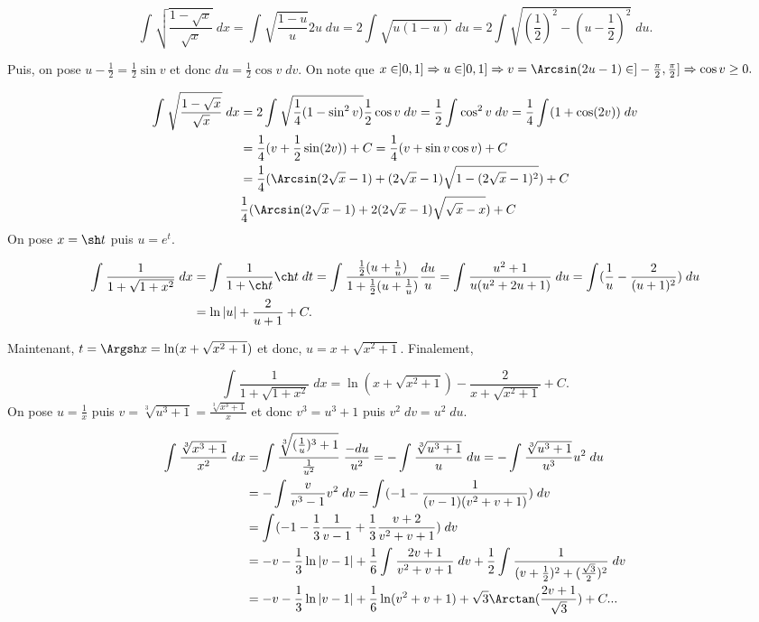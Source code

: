 {{$$\int_{}^{}\sqrt{\frac{1-\sqrt{x}}{\sqrt{x}}}\;dx=\int_{}^{}\sqrt{\frac{1-u}{u}}2u\;du=2\int_{}^{}\sqrt{u(1-u)}\;du
=2\int_{}^{}\sqrt{(\frac{1}{2})^2-(u-\frac{1}{2})^2}\;du.$$

Puis, on pose $u-\frac{1}{2}=\frac{1}{2}\sin v$ et donc $du=\frac{1}{2}\cos v\;dv$. 
On note que $x\in]0,1]\Rightarrow u\in]0,1]\Rightarrow v=\Arcsin(2u-1)\in]-\frac{\pi}{2},\frac{\pi}{2}]\Rightarrow\cos v\geq0.$

\begin{align*}\ensuremath
\int_{}^{}\sqrt{\frac{1-\sqrt{x}}{\sqrt{x}}}\;dx&=2\int_{}^{}\sqrt{\frac{1}{4}(1-\sin^2v)}\frac{1}{2}\cos v\;dv
=\frac{1}{2}\int_{}^{}\cos^2v\;dv=\frac{1}{4}\int_{}^{}(1+\cos(2v))\;dv\\
 &=\frac{1}{4}(v+\frac{1}{2}\sin(2v))+C=\frac{1}{4}(v+\sin v\cos v)+C\\
 &=\frac{1}{4}(\Arcsin(2\sqrt{x}-1)+(2\sqrt{x}-1)\sqrt{1-(2\sqrt{x}-1)^2})+C\\
 &\frac{1}{4}(\Arcsin(2\sqrt{x}-1)+2(2\sqrt{x}-1)\sqrt{\sqrt{x}-x})+C
\end{align*}
On pose $x=\sh t$ puis $u=e^t$.

\begin{align*}\ensuremath
\int_{}^{}\frac{1}{1+\sqrt{1+x^2}}\;dx&=\int_{}^{}\frac{1}{1+\ch t}\ch t\;dt=\int_{}^{}\frac{\frac{1}{2}(u+\frac{1}{u})}{1+\frac{1}{2}(u+\frac{1}{u})}\frac{du}{u}
=\int_{}^{}\frac{u^2+1}{u(u^2+2u+1)}\;du=\int_{}^{}(\frac{1}{u}-\frac{2}{(u+1)^2})\;du\\
 &=\ln|u|+\frac{2}{u+1}+C.
\end{align*}

Maintenant, $t=\Argsh x=\ln(x+\sqrt{x^2+1})$ et donc, $u=x+\sqrt{x^2+1}$. Finalement,

$$\int_{}^{}\frac{1}{1+\sqrt{1+x^2}}\;dx=\ln(x+\sqrt{x^2+1})-\frac{2}{x+\sqrt{x^2+1}}+C.$$
On pose $u=\frac{1}{x}$ puis $v=\sqrt[3]{u^3+1}=\frac{\sqrt[3]{x^3+1}}{x}$ et donc $v^3=u^3+1$ puis $v^2\;dv=u^2\;du$.

\begin{align*}\ensuremath
\int_{}^{}\frac{\sqrt[3]{x^3+1}}{x^2}\;dx&=\int_{}^{}\frac{\sqrt[3]{(\frac{1}{u})^3+1}}{\frac{1}{u^2}}\;\frac{-du}{u^2}=-\int_{}^{}\frac{\sqrt[3]{u^3+1}}{u}\;du=-\int_{}^{}\frac{\sqrt[3]{u^3+1}}{u^3}u^2\;du\\
 &=-\int_{}^{}\frac{v}{v^3-1}v^2\;dv=\int_{}^{}(-1-\frac{1}{(v-1)(v^2+v+1)})\;dv\\
 &=\int_{}^{}(-1-\frac{1}{3}\frac{1}{v-1}+\frac{1}{3}\frac{v+2}{v^2+v+1})\;dv\\
 &=-v-\frac{1}{3}\ln|v-1|+\frac{1}{6}\int_{}^{}\frac{2v+1}{v^2+v+1}\;dv+\frac{1}{2}\int_{}^{}\frac{1}{(v+\frac{1}{2})^2+(\frac{\sqrt{3}}{2})^2}\;dv\\
 &=-v-\frac{1}{3}\ln|v-1|+\frac{1}{6}\ln(v^2+v+1)+\sqrt{3}\Arctan(\frac{2v+1}{\sqrt{3}})+C...
\end{align*}
}
}
